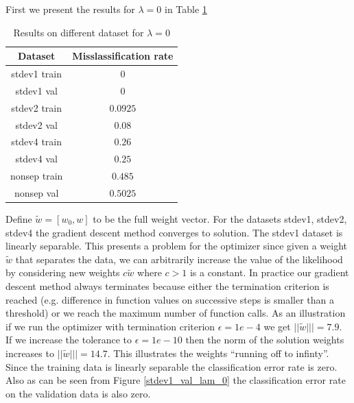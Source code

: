 \documentclass[10pt]{article}
\begin{document}
First we present the results for $\lambda = 0$ in Table \ref{lam_0}
\begin{table}[H]
\begin{tabular}{|c|c|}
\hline
\textbf{Dataset} & \textbf{Misslassification rate} \\ \hline
stdev1 train & $0$\\ \hline
stdev1 val & $0$\\ \hline
stdev2 train & $0.0925$\\ \hline
stdev2 val & $0.08$\\ \hline
stdev4 train & $0.26$\\ \hline
stdev4 val & $0.25$\\ \hline
nonsep train & $0.485$\\ \hline
nonsep val & $0.5025$\\ \hline
\end{tabular}

\caption{Results on different dataset for $\lambda = 0$}
\label{lam_0}
\end{table}


 Define $\tilde{w} = [w_0,w]$ to be the full weight vector. For the datasets stdev1, stdev2, stdev4 the gradient descent method converges to solution. The stdev1 dataset is linearly separable. This presents a problem for the optimizer since given a weight $\tilde{w}$ that separates the data, we can arbitrarily increase the value of the likelihood by considering new weights $c \tilde{w}$ where $c > 1$ is a constant. In practice our gradient descent method always terminates because either the termination criterion is reached (e.g. difference in function values on successive steps is smaller than a threshold) or we reach the maximum number of function calls. As an illustration if we run the optimizer with termination criterion $\epsilon = 1e-4$ we get $||\tilde{w}||| = 7.9$. If we increase the tolerance to $\epsilon = 1e-10$ then the norm of the solution weights increases to $||\tilde{w}||| = 14.7$. This illustrates the weights ``running off to infinty''. Since the training data is linearly separable the classification error rate is zero. Also as can be seen from Figure \ref{stdev1_val_lam_0} the classification error rate on the validation data is also zero.

\end{document}
